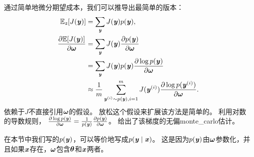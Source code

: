 通过简单地微分期望成本，我们可以推导出最简单的版本：
\begin{align}
 \SetE_{\Vz}[J(\Vy)] &= \sum_{\Vy} J(\Vy) p(\Vy), \\
 \frac{\partial \SetE[J(\Vy)]}{\partial \Vomega} &= \sum_{\Vy} J(\Vy)
 \frac{\partial p(\Vy)}{\partial \Vomega} \label{eq:sum_exp} \\
 &=  \sum_{\Vy} J(\Vy) p(\Vy) \frac{\partial\log p(\Vy)}{\partial \Vomega} 
 \label{eq:sum_log} \\
 & \approx \frac{1}{m} \sum_{\Vy^{(i)} \sim p(\Vy), i=1}^m 
 J(\Vy^{(i)}) \frac{\partial\log p(\Vy^{(i)})}{\partial \Vomega}. \label{eq:sum_prob}
\end{align}
依赖于$J$不直接引用$\Vomega$的假设。
放松这个假设来扩展该方法是简单的。
利用对数的导数规则，
$\frac{\partial\log p(\Vy)}{\partial \Vomega} = \frac{1}{p(\Vy)}
\frac{\partial p(\Vy)}{\partial \Vomega}$。
给出了该梯度的无偏\gls{monte_carlo}估计。


在本节中我们写的$p(\Vy)$，可以等价地写成$p(\Vy  \mid  \Vx)$。
这是因为$p(\Vy)$由$\Vomega$参数化，并且如果$\Vx$存在，$\Vomega$包含$\Vtheta$和$\Vx$两者。

